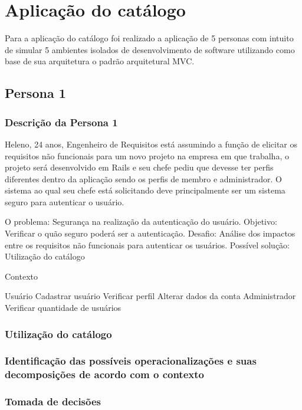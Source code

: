 \section{Aplicação do catálogo}


Para a aplicação do catálogo foi realizado a aplicação de 5 personas com intuito de simular 5 ambientes isolados de desenvolvimento de software utilizando como base de sua arquitetura o padrão arquitetural MVC. 

\subsection{Persona 1}
\label{subsec:persona1}

\subsubsection{Descrição da Persona 1}

Heleno, 24 anos, Engenheiro de Requisitos está assumindo a função de elicitar os requisitos não funcionais para um novo projeto na empresa em que trabalha, o projeto será desenvolvido em Rails e seu chefe pediu que devesse ter perfis diferentes dentro da aplicação sendo os perfis de membro e administrador. O sistema ao qual seu chefe está solicitando deve principalmente ser um sistema seguro para autenticar o usuário.

O problema: Segurança na realização da autenticação do usuário.
Objetivo: Verificar o quão seguro poderá ser a autenticação. 
Desafio: Análise dos impactos entre os requisitos não funcionais para autenticar os usuários.
Possível solução: Utilização do catálogo

Contexto

Usuário 
Cadastrar usuário
Verificar perfil
Alterar dados da conta
Administrador 
Verificar quantidade de usuários

\subsubsection{Utilização do catálogo}


\subsubsection{Identificação das possíveis operacionalizações e suas decomposições de acordo com o contexto}

\subsubsection{Tomada de decisões}

